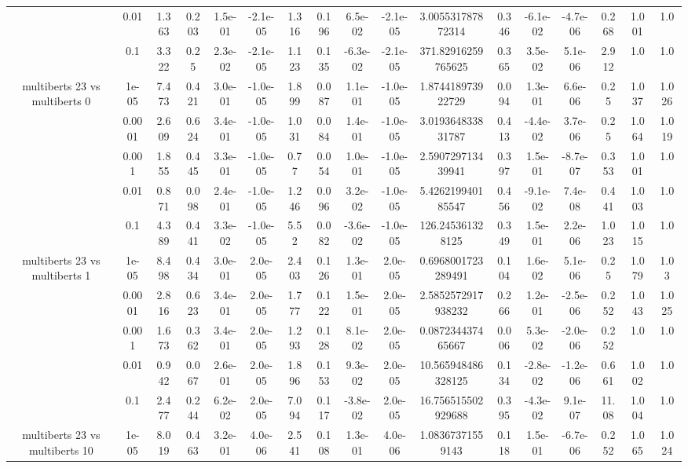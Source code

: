 \begin{tabular}{|c|c|c|c|c|c|c|c|c|c|c|c|c|c|c|c|c|}
 & 0.01 & 1.363 & 0.203 & 1.5e-01 & -2.1e-05 & 1.316 & 0.196 & 6.5e-02 & -2.1e-05 & 3.005531787872314 & 0.346 & -6.1e-02 & -4.7e-06 & 0.268 & 1.001 & 1.0 \\
 & 0.1 & 3.322 & 0.25 & 2.3e-02 & -2.1e-05 & 1.123 & 0.135 & -6.3e-02 & -2.1e-05 & 371.82916259765625 & 0.365 & 3.5e-02 & 5.1e-06 & 2.912 & 1.0 & 1.0 \\
\hline
\multirow{5}{*}{multiberts 23 vs multiberts 0} & 1e-05 & 7.473 & 0.421 & 3.0e-01 & -1.0e-05 & 1.899 & 0.087 & 1.1e-01 & -1.0e-05 & 1.874418973922729 & 0.094 & 1.3e-01 & 6.6e-06 & 0.25 & 1.037 & 1.026 \\
 & 0.0001 & 2.609 & 0.624 & 3.4e-01 & -1.0e-05 & 1.031 & 0.084 & 1.4e-01 & -1.0e-05 & 3.019364833831787 & 0.413 & -4.4e-02 & 3.7e-06 & 0.25 & 1.064 & 1.019 \\
 & 0.001 & 1.855 & 0.445 & 3.3e-01 & -1.0e-05 & 0.77 & 0.054 & 1.0e-01 & -1.0e-05 & 2.590729713439941 & 0.397 & 1.5e-01 & -8.7e-07 & 0.353 & 1.001 & 1.0 \\
 & 0.01 & 0.871 & 0.098 & 2.4e-01 & -1.0e-05 & 1.246 & 0.096 & 3.2e-02 & -1.0e-05 & 5.426219940185547 & 0.456 & -9.1e-02 & 7.4e-08 & 0.441 & 1.003 & 1.0 \\
 & 0.1 & 4.389 & 0.441 & 3.3e-02 & -1.0e-05 & 5.52 & 0.082 & -3.6e-02 & -1.0e-05 & 126.245361328125 & 0.349 & 1.5e-01 & 2.2e-06 & 1.023 & 1.015 & 1.0 \\
\hline
\multirow{5}{*}{multiberts 23 vs multiberts 1} & 1e-05 & 8.498 & 0.434 & 3.0e-01 & 2.0e-05 & 2.403 & 0.126 & 1.3e-01 & 2.0e-05 & 0.6968001723289491 & 0.104 & 1.6e-02 & 5.1e-06 & 0.25 & 1.079 & 1.03 \\
 & 0.0001 & 2.816 & 0.623 & 3.4e-01 & 2.0e-05 & 1.777 & 0.122 & 1.5e-01 & 2.0e-05 & 2.5852572917938232 & 0.266 & 1.2e-01 & -2.5e-06 & 0.252 & 1.043 & 1.025 \\
 & 0.001 & 1.673 & 0.362 & 3.4e-01 & 2.0e-05 & 1.293 & 0.128 & 8.1e-02 & 2.0e-05 & 0.087234437465667 & 0.006 & 5.3e-02 & -2.0e-06 & 0.252 & 1.0 & 1.0 \\
 & 0.01 & 0.942 & 0.067 & 2.6e-01 & 2.0e-05 & 1.896 & 0.153 & 9.3e-02 & 2.0e-05 & 10.565948486328125 & 0.134 & -2.8e-02 & -1.2e-06 & 0.661 & 1.002 & 1.0 \\
 & 0.1 & 2.477 & 0.244 & 6.2e-02 & 2.0e-05 & 7.094 & 0.117 & -3.8e-02 & 2.0e-05 & 16.756515502929688 & 0.395 & -4.3e-02 & 9.1e-07 & 11.08 & 1.004 & 1.0 \\
\hline
\multirow{5}{*}{multiberts 23 vs multiberts 10} & 1e-05 & 8.019 & 0.463 & 3.2e-01 & 4.0e-06 & 2.541 & 0.108 & 1.3e-01 & 4.0e-06 & 1.08367371559143 & 0.118 & 1.5e-01 & -6.7e-06 & 0.252 & 1.065 & 1.024 \\

\end{tabular}
